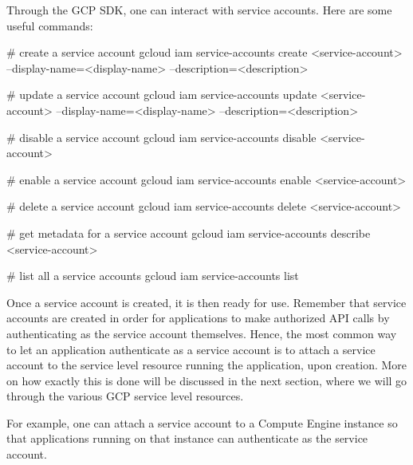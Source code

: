 Through the GCP SDK, one can interact with service accounts. Here are some useful commands:

\begin{bash}
# create a service account
gcloud iam service-accounts create <service-account> --display-name=<display-name> --description=<description>
\end{bash}

\begin{bash}
# update a service account
gcloud iam service-accounts update <service-account> --display-name=<display-name> --description=<description>
\end{bash}

\begin{bash}
# disable a service account
gcloud iam service-accounts disable <service-account>
\end{bash}

\begin{bash}
# enable a service account
gcloud iam service-accounts enable <service-account>
\end{bash}

\begin{bash}
# delete a service account
gcloud iam service-accounts delete <service-account>
\end{bash}

\begin{bash}
# get metadata for a service account
gcloud iam service-accounts describe <service-account>
\end{bash}

\begin{bash}
# list all a service accounts
gcloud iam service-accounts list
\end{bash}

Once a service account is created, it is then ready for use. Remember that service accounts are created in order for
applications to make authorized API calls by authenticating as the service account themselves. Hence, the most common
way to let an application authenticate as a service account is to attach a service account to the service level resource
running the application, upon creation. More on how exactly this is done will be discussed in the next section, where
we will go through the various GCP service level resources.

\be
For example, one can attach a service account to a Compute Engine instance so that applications running on that instance
can authenticate as the service account.
\ee

